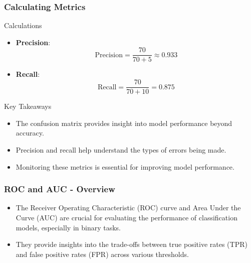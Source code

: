 \documentclass{beamer}
\begin{document}
\begin{frame}[fragile]
    \frametitle{Calculating Metrics}
    \begin{block}{Calculations}
        \begin{itemize}
            \item \textbf{Precision}:
            \[
            \text{Precision} = \frac{70}{70 + 5} \approx 0.933
            \]
            \item \textbf{Recall}:
            \[
            \text{Recall} = \frac{70}{70 + 10} = 0.875
            \]
        \end{itemize}
    \end{block}

    \begin{block}{Key Takeaways}
        \begin{itemize}
            \item The confusion matrix provides insight into model performance beyond accuracy.
            \item Precision and recall help understand the types of errors being made.
            \item Monitoring these metrics is essential for improving model performance.
        \end{itemize}
    \end{block}
\end{frame}

\begin{frame}[fragile]
    \frametitle{ROC and AUC - Overview}
    \begin{itemize}
        \item The Receiver Operating Characteristic (ROC) curve and Area Under the Curve (AUC) are crucial for evaluating the performance of classification models, especially in binary tasks.
        \item They provide insights into the trade-offs between true positive rates (TPR) and false positive rates (FPR) across various thresholds.
    \end{itemize}
\end{frame}
\end{document}
